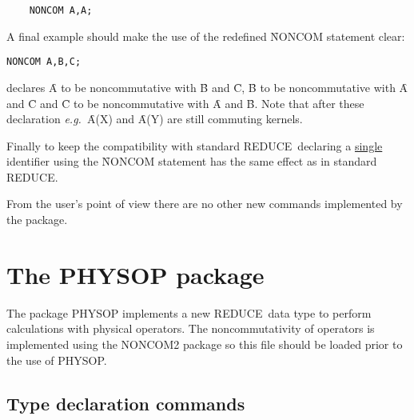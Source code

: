 \documentclass[11pt,letterpaper]{book}
\newcommand{\REDUCE}{REDUCE}
\begin{document}
{\small\begin{verbatim}
    NONCOM A,A;
\end{verbatim}}

A final example should make
the use of the redefined \f{NONCOM} statement clear:

{\small\begin{verbatim}
NONCOM A,B,C;
\end{verbatim}}
declares \f{A}  to be noncommutative with \f{B} and \f{C},
\f{B} to be noncommutative
with \f{A} and \f{C} and \f{C} to be noncommutative
with \f{A} and \f{B}.
Note that after these declaration
{\em e.g.\ }\f{A(X)} and \f{A(Y)}
are still commuting kernels.

Finally to keep the compatibility with standard \REDUCE\, declaring a
\underline{single} identifier using the \f{NONCOM} statement has the same
effect as in
standard \REDUCE.

From the user's point of view there are no other
new commands implemented by the package.


\section{The PHYSOP package}

The package PHYSOP implements a new \REDUCE\ data type to perform
calculations with physical operators.  The noncommutativity of
operators is
implemented using the NONCOM2 package so this file should be loaded
prior to the use of PHYSOP.

\subsection{Type declaration commands}
\end{document}
